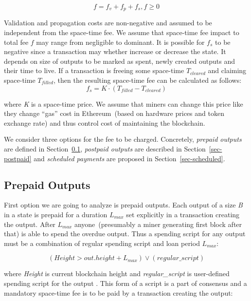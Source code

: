 \documentclass[]{llncs}   %
\newcommand{\authnote}[2]{\marginpar{\parbox{\marginparwidth}{\tiny %
  \textsf{#1 {\textcolor{blue}{notes: #2}}}}}%
  \textcolor{blue}{\textbf{\dag}}}
\newcommand{\authnote}[2]{
  \textsf{#1 \textcolor{blue}{: #2}}}
\newcommand{\authnote}[2]{}
\newcommand{\knote}[1]{{\authnote{\textcolor{green}{Alex notes}}{#1}}}
\newcommand{\dnote}[1]{{\authnote{\textcolor{red}{Dima notes}}{#1}}}
\begin{document}
\begin{equation}
f = f_v + f_p + f_s , f \ge 0
\end{equation}

Validation and propagation costs are non-negative and assumed to be independent from the space-time fee. We assume that space-time fee impact to total fee $f$ may range from negligible to dominant. It is possible for $f_s$ to be negative since a transaction may whether increase or decrease the state. It depends on size of outputs to be marked as spent, newly created outputs and their time to live. If a transaction is freeing some space-time \textit{$T_{cleared}$} and claiming space-time \textit{$T_{filled}$}, then the  resulting space-time fee can be calculated as follows:
\begin{equation}
f_s = K \cdot (T_{filled} - T_{cleared})
\end{equation}

\knote{we need to say somehow here about prepaid and postpaid outputs defined below}

where \textit{K} is a space-time price. We assume that miners can change this price like they change ``gas'' cost in Ethereum~(based on hardware prices and token exchange rate) and thus control cost of maintaining the blockchain.

We consider three options for the fee to be charged. Concretely, \textit{prepaid outputs} are defined in Section~\ref{sec-prepaid}, \textit{postpaid outputs} are described in Section~\ref{sec-postpaid} and \textit{scheduled payments} are proposed in Section~\ref{sec-scheduled}.

\subsection{Prepaid Outputs}
\label{sec-prepaid}

First option we are going to analyze is prepaid outputs. Each output of a size \textit{B} in a state is prepaid for a duration $L_{max}$ set explicitly in a transaction creating the output. After $L_{max}$ anyone~(presumably a miner generating first block after that) is able to spend the overdue output. Thus a spending script for any output must be a combination of regular spending script and loan period $L_{max}$:

\begin{equation}
(Height > out.height + L_{max}) \lor (regular\_script)
\end{equation}

where \textit{Height} is current blockchain height and \textit{regular\_script} is user-defined spending script for the output\dnote{What is out.height?}. This form of a script is a part of consensus and a mandatory space-time fee is to be paid by a transaction creating the output:
\end{document}

